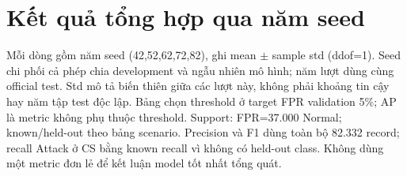 \documentclass[12pt,a4paper,oneside]{report}
\begin{document}
\clearpage\section{Kết quả tổng hợp qua năm seed}\label{sec:metrics}
Mỗi dòng gồm năm seed (42,52,62,72,82), ghi mean $\pm$ sample std (ddof=1). Seed chi phối cả phép chia development và ngẫu nhiên mô hình; năm lượt dùng cùng official test. Std mô tả biến thiên giữa các lượt này, không phải khoảng tin cậy hay năm tập test độc lập. Bảng chọn threshold ở target FPR validation 5\%; AP là metric không phụ thuộc threshold. Support: FPR=37.000 Normal; known/held-out theo bảng scenario. Precision và F1 dùng toàn bộ 82.332 record; recall Attack ở CS bằng known recall vì không có held-out class. Không dùng một metric đơn lẻ để kết luận model tốt nhất tổng quát.
\begingroup\fontsize{9pt}{11pt}\selectfont\setlength{\tabcolsep}{3pt}\renewcommand{\arraystretch}{1.2}
\end{document}
